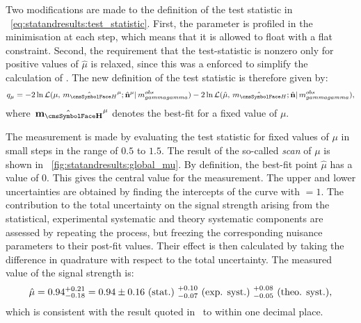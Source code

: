 Two modifications are made to the definition of the test statistic in \Eq~\ref{eq:statandresults:test_statistic}. First, the \mH parameter is profiled in the minimisation at each step, which means that it is allowed to float with a flat constraint. Second, the requirement that the test-statistic is nonzero only for positive values of $\hat{\mu}$ is relaxed, since this was a enforced to simplify the calculation of \pvalue\s. The new definition of the test statistic is therefore given by: 
\begin{equation}
\label{eq:statandresults:test_statistic_profMH}
q_{\mu} = -2 \ln \mathcal{L}(\mu,\hat{\mH}^{\mu}; \hat{\mathbf{n}}^{\mu}| \mgg^{obs})- 2\ln\mathcal{L}(\hat{\mu},\hat{\mH};\hat{\mathbf{n}}| \mgg^{obs} ), 
\end{equation}
where $\hat{\mathbf{\mH}}^{\mu}$ denotes the best-fit \mH for a fixed value of $\mu$. %

The measurement is made by evaluating the test statistic for fixed values of $\mu$ in small steps in the range of $0.5$ to $1.5$. The result of the so-called \DNLL \emph{scan} of $\mu$ is shown in \Fig~\ref{fig:statandresults:global_mu}. By definition, the best-fit point $\hat{\mu}$ has a \DNLL value of $0$. This gives the central value for the measurement. The upper and lower uncertainties are obtained by finding the intercepts of the curve with \DNLL$=1$. 
The contribution to the total uncertainty on the signal strength arising from the statistical, experimental systematic and theory systematic components are assessed by repeating the process, but freezing the corresponding nuisance parameters to their post-fit values. Their effect is then calculated by taking the difference in quadrature with respect to the total uncertainty. 
The measured value of the signal strength is:
\begin{equation*}
\hat{\mu} = 0.94^{+0.21}_{-0.18} = 0.94 \pm 0.16 \text{~(stat.)~} ^{+0.10}_{-0.07} \text{~(exp. syst.)~} ^{+0.08}_{-0.05} \text{~(theo. syst.)},
\end{equation*}
which is consistent with the result quoted in~\cite{CMS-PAS-HIG-16-020} to within one decimal place. 

